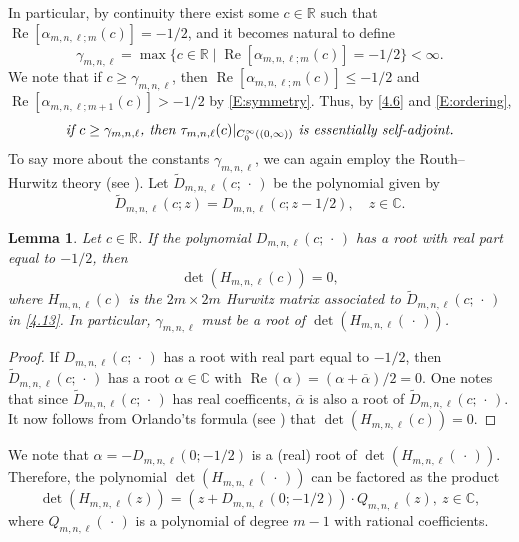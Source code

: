 \documentclass[reqno,11pt,centertags]{amsart}
\newcommand{\bbR}{{\mathbb{R}}}
\newcommand{\bbC}{{\mathbb{C}}}
\newcommand{\<}{\langle}
\renewcommand{\>}{\rangle}
\newcommand{\lb}{\label}
\newcommand{\dott}{\,\cdot\,}
\renewcommand{\Re}{\operatorname{Re}}
\numberwithin{equation}{section}
\newtheorem{lemma}[theorem]{Lemma}
\theoremstyle{definition}
\begin{document}
In particular, by continuity there exist some $c\in \bbR$ such that $\Re [\alpha_{m,n,\ell;m}(c)]=-1/2$,
and it becomes natural to define
\begin{equation}
\gamma_{m,n,\ell}= \max\{ c\in \bbR \mid \Re [\alpha_{m,n,\ell;m}(c)]=-1/2\} <\infty.
\end{equation}
We note that if $c\geq  \gamma_{m,n,\ell}$, then $\Re [\alpha_{m,n,\ell;m}(c)]\leq -1/2$ and 
$\Re [\alpha_{m,n,\ell;m+1}(c)] >-1/2$ by \eqref{E:symmetry}.
Thus, by  \eqref{4.6} and \eqref{E:ordering},
\begin{equation}\lb{E:nec}
\mbox{\it if $c\geq  \gamma_{m,n,\ell}$, then $\tau_{m,n,\ell}(c)|_{C_0^{\infty}((0,\infty))}$ is essentially self-adjoint.}
\end{equation}
To say more about the constants $\gamma_{m,n,\ell}$, we can again employ the Routh--Hurwitz theory (see \cite[Ch.~XV]{Ga59}). Let $\widetilde{D}_{m,n,\ell}(c;\dott)$ be the polynomial given by 
\begin{equation}
\widetilde{D}_{m,n,\ell}(c; z)= D_{m,n,\ell}(c; z-1/2), \quad z\in \bbC.      \lb{4.13} 
\end{equation} 

\begin{lemma} \lb{l4.2}
Let $c\in \bbR$. If the polynomial $D_{m,n,\ell}(c;\dott)$ has a root with real part equal to $-1/2$, then 
\begin{equation}\lb{E:Hurwitz}
\det (H_{m,n,\ell}(c))=0,
\end{equation}
where $H_{m,n,\ell}(c)$ is the $2m\times 2m$ Hurwitz matrix associated to $\widetilde{D}_{m,n,\ell}(c;\dott)$ in \eqref{4.13}.
In particular, $\gamma_{m,n,\ell}$ must be a root of  $\det (H_{m,n,\ell}(\dott))$.
\end{lemma}
\begin{proof}
If $D_{m,n,\ell}(c;\dott)$ has a root with real part equal to $-1/2$, then $\widetilde{D}_{m,n,\ell}(c;\dott)$  has a root 
$\alpha\in \bbC$  with $\Re(\alpha)=(\alpha+\overline{\alpha})/2=0$. One notes that since $\widetilde{D}_{m,n,\ell}(c;\dott)$ has real coefficents,
$\overline{\alpha}$ is also a root of $\widetilde{D}_{m,n,\ell}(c;\dott)$. It now follows from Orlando'ts formula (see \cite[\S~XV.7]{Ga59}) that $\det (H_{m,n,\ell}(c))=0$. 
 \end{proof}

We note that $\alpha=-D_{m,n,\ell}(0;-1/2)$ is a (real) root of $\det (H_{m,n,\ell}(\dott))$. Therefore, the polynomial $\det (H_{m,n,\ell}(\dott))$ can be factored as the product  
\begin{equation}\lb{E:factorization}
\det (H_{m,n,\ell}(z)) = \left(z + D_{m,n,\ell}(0; -1/2)\right) \cdot Q_{m,n,\ell}(z), \ z\in \bbC,
\end{equation}
where $Q_{m,n,\ell}(\dott)$ is a polynomial of degree $m-1$ with rational coefficients.
\end{document}
